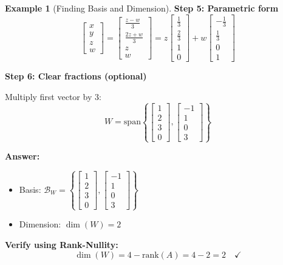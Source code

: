 \documentclass[12pt,a4paper]{article}
\theoremstyle{definition}
\newtheorem{example}{Example}[section]
\begin{document}
\begin{example}[Finding Basis and Dimension]
\textbf{Step 5: Parametric form}
\begin{equation}
\begin{bmatrix} x \\ y \\ z \\ w \end{bmatrix} = \begin{bmatrix} \frac{z - w}{3} \\ \frac{2z + w}{3} \\ z \\ w \end{bmatrix} = z\begin{bmatrix} \frac{1}{3} \\ \frac{2}{3} \\ 1 \\ 0 \end{bmatrix} + w\begin{bmatrix} -\frac{1}{3} \\ \frac{1}{3} \\ 0 \\ 1 \end{bmatrix}
\end{equation}

\textbf{Step 6: Clear fractions (optional)}

Multiply first vector by 3:
\begin{equation}
W = \text{span}\left\{\begin{bmatrix} 1 \\ 2 \\ 3 \\ 0 \end{bmatrix}, \begin{bmatrix} -1 \\ 1 \\ 0 \\ 3 \end{bmatrix}\right\}
\end{equation}

\textbf{Answer:}
\begin{itemize}
    \item Basis: $\mathcal{B}_W = \left\{\begin{bmatrix} 1 \\ 2 \\ 3 \\ 0 \end{bmatrix}, \begin{bmatrix} -1 \\ 1 \\ 0 \\ 3 \end{bmatrix}\right\}$
    \item Dimension: $\dim(W) = 2$
\end{itemize}

\textbf{Verify using Rank-Nullity:}
\begin{equation}
\dim(W) = 4 - \text{rank}(A) = 4 - 2 = 2 \quad ✓
\end{equation}
\end{example}
\end{document}
